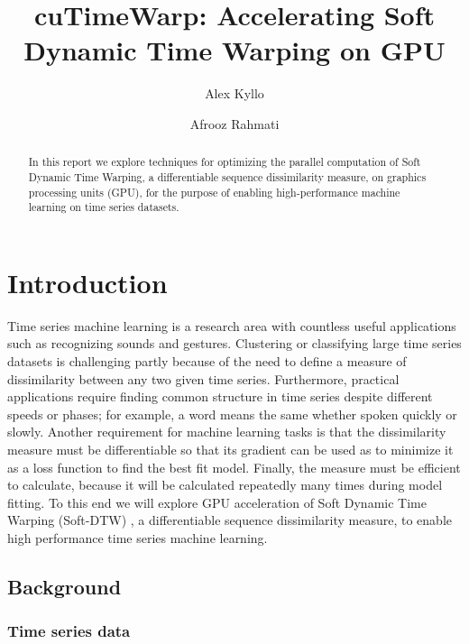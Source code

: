 \documentclass[12pt, letterpaper]{article}
\title{cuTimeWarp: Accelerating Soft Dynamic Time Warping on GPU}
\author{Alex Kyllo \and Afrooz Rahmati}
\begin{document}
\maketitle

\begin{abstract}

In this report we explore techniques for optimizing the parallel computation of
Soft Dynamic Time Warping, a differentiable sequence dissimilarity measure, on
graphics processing units (GPU), for the purpose of enabling high-performance
machine learning on time series datasets.

\end{abstract}

\section{Introduction}

Time series machine learning is a research area with countless useful
applications such as recognizing sounds and gestures. Clustering or classifying
large time series datasets is challenging partly because of the need to define a
measure of dissimilarity between any two given time series. Furthermore,
practical applications require finding common structure in time series despite
different speeds or phases; for example, a word means the same whether spoken
quickly or slowly. Another requirement for machine learning tasks is that the
dissimilarity measure must be differentiable so that its gradient can be used as
to minimize it as a loss function to find the best fit model. Finally, the
measure must be efficient to calculate, because it will be calculated repeatedly
many times during model fitting. To this end we will explore GPU acceleration of
Soft Dynamic Time Warping (Soft-DTW) \cite{cuturi_soft-dtw_2018}, a
differentiable sequence dissimilarity measure, to enable high performance time
series machine learning.

\subsection{Background}

\subsubsection{Time series data}
\end{document}
